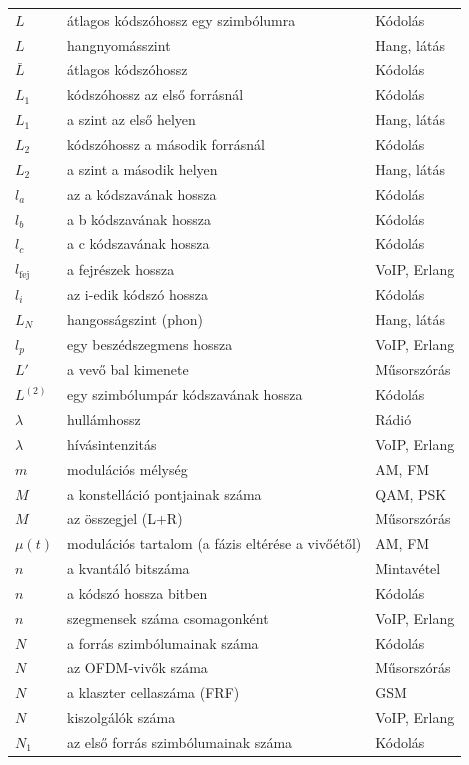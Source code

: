 {\begin{longtable}{@{}>{\raggedright\arraybackslash}p{2.4cm}>{\raggedright\arraybackslash}p{8.2cm}>{\raggedright\arraybackslash}p{3.8cm}@{}}
$L$ & átlagos kódszóhossz egy szimbólumra & Kódolás\\
$L$ & hangnyomásszint & Hang, látás\\
$\bar L$ & átlagos kódszóhossz & Kódolás\\
$L_1$ & kódszóhossz az első forrásnál & Kódolás\\
$L_1$ & a szint az első helyen & Hang, látás\\
$L_2$ & kódszóhossz a második forrásnál & Kódolás\\
$L_2$ & a szint a második helyen & Hang, látás\\
$l_a$ & az a kódszavának hossza & Kódolás\\
$l_b$ & a b kódszavának hossza & Kódolás\\
$l_c$ & a c kódszavának hossza & Kódolás\\
$l_\text{fej}$ & a fejrészek hossza & VoIP, Erlang\\
$l_i$ & az i-edik kódszó hossza & Kódolás\\
$L_N$ & hangosságszint (phon) & Hang, látás\\
$l_p$ & egy beszédszegmens hossza & VoIP, Erlang\\
$L'$ & a vevő bal kimenete & Műsorszórás\\
$L^{(2)}$ & egy szimbólumpár kódszavának hossza & Kódolás\\
$\lambda$ & hullámhossz & Rádió\\
$\lambda$ & hívásintenzitás & VoIP, Erlang\\
$m$ & modulációs mélység & AM, FM\\
$M$ & a konstelláció pontjainak száma & QAM, PSK\\
$M$ & az összegjel (L+R) & Műsorszórás\\
$\mu(t)$ & modulációs tartalom (a fázis eltérése a vivőétől) & AM, FM\\
$n$ & a kvantáló bitszáma & Mintavétel\\
$n$ & a kódszó hossza bitben & Kódolás\\
$n$ & szegmensek száma csomagonként & VoIP, Erlang\\
$N$ & a forrás szimbólumainak száma & Kódolás\\
$N$ & az OFDM-vivők száma & Műsorszórás\\
$N$ & a klaszter cellaszáma (FRF) & GSM\\
$N$ & kiszolgálók száma & VoIP, Erlang\\
$N_1$ & az első forrás szimbólumainak száma & Kódolás\\

\end{longtable}}
